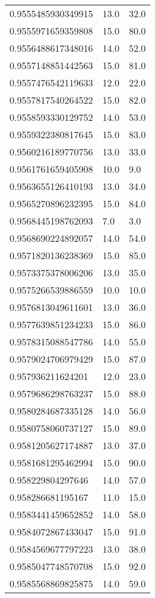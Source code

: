 \begin{center}
\begin{supertabular}[H]{p{0.30\textwidth}p{0.05\textwidth}p{0.05\textwidth}}
0.9555485930349915 & 13.0 & 32.0 \\ 
0.9555971659359808 & 15.0 & 80.0 \\ 
0.9556488617348016 & 14.0 & 52.0 \\ 
0.9557148851442563 & 15.0 & 81.0 \\ 
0.9557476542119633 & 12.0 & 22.0 \\ 
0.9557817540264522 & 15.0 & 82.0 \\ 
0.9558593330129752 & 14.0 & 53.0 \\ 
0.9559322380817645 & 15.0 & 83.0 \\ 
0.9560216189770756 & 13.0 & 33.0 \\ 
0.9561761659405908 & 10.0 & 9.0 \\ 
0.9563655126410193 & 13.0 & 34.0 \\ 
0.9565270896232395 & 15.0 & 84.0 \\ 
0.9568445198762093 & 7.0 & 3.0 \\ 
0.9568690224892057 & 14.0 & 54.0 \\ 
0.9571820136238369 & 15.0 & 85.0 \\ 
0.9573375378006206 & 13.0 & 35.0 \\ 
0.9575266539886559 & 10.0 & 10.0 \\ 
0.9576813049611601 & 13.0 & 36.0 \\ 
0.9577639851234233 & 15.0 & 86.0 \\ 
0.9578315088547786 & 14.0 & 55.0 \\ 
0.9579024706979429 & 15.0 & 87.0 \\ 
0.957936211624201 & 12.0 & 23.0 \\ 
0.9579686298763237 & 15.0 & 88.0 \\ 
0.9580284687335128 & 14.0 & 56.0 \\ 
0.9580758060737127 & 15.0 & 89.0 \\ 
0.9581205627174887 & 13.0 & 37.0 \\ 
0.9581681295462994 & 15.0 & 90.0 \\ 
0.958229804297646 & 14.0 & 57.0 \\ 
0.958286681195167 & 11.0 & 15.0 \\ 
0.9583441459652852 & 14.0 & 58.0 \\ 
0.9584072867433047 & 15.0 & 91.0 \\ 
0.9584569677797223 & 13.0 & 38.0 \\ 
0.9585047748570708 & 15.0 & 92.0 \\ 
0.9585568869825875 & 14.0 & 59.0 \\ 

\end{supertabular}
\end{center}
